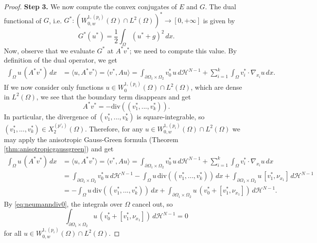 \documentclass[reqno,12pt]{amsart}
\numberwithin{equation}{section}
\begin{document}
\begin{proof}
{\flushleft \bf Step 3.} We now compute the convex conjugates of $E$ and $G$. The dual functional of $G$, i.e. $G^* : (W_{0,w}^{1,(p_i)}(\Omega) \cap L^2(\Omega))^* \rightarrow [0,+\infty ]$ is given by
$$G^*(u^*) = \displaystyle\frac12 \int_\Omega (u^*  + g)^2 \, dx.$$
Now, observe that we evaluate $G^*$ at $A^* v^*$; we need to compute this value. By definition of the dual operator, we get
\begin{align}
\int_\Omega u \, (A^* v^*) \, dx &= \langle u, A^* v^* \rangle  = \langle v^*, Au \rangle = \int_{\partial\Omega_1 \times \Omega_2} v^*_0 \, u \, d\mathcal{H}^{N-1} + \sum_{i=1}^k \int_\Omega v_i^* \cdot \nabla_{x_i} u \, dx.
\end{align}
If we now consider only functions $u \in W_0^{1,(p_i)}(\Omega) \cap L^2(\Omega)$, which are dense in $L^2(\Omega)$, we see that the boundary term disappears and get
\begin{equation}\label{eq:neumanndiv0}
A^* v^* =- \mathrm{div}((v_1^*, ..., v_k^*)).
\end{equation}
In particular, the divergence of $(v_1^*, ..., v_k^*)$ is square-integrable, so $(v_1^*, ..., v_k^*) \in X_2^{(p'_i)}(\Omega)$. Therefore, for any $u \in W_{0,w}^{1,(p_i)}(\Omega) \cap L^2(\Omega)$ we may apply the anisotropic Gauss-Green formula (Theorem \ref{thm:anisotropicgaussgreen}) and get
\begin{align}
\int_\Omega u \, (A^* v^*) \, dx &= \langle u, A^* v^* \rangle  = \langle v^*, Au \rangle = \int_{\partial\Omega_1 \times \Omega_2} v^*_0 \, u \, d\mathcal{H}^{N-1} + \sum_{i=1}^k \int_\Omega v_i^* \cdot \nabla_{x_i} u \, dx \\
& = \int_{\partial\Omega_1 \times \Omega_2} v^*_0 \, u \, d\mathcal{H}^{N-1} - \int_\Omega u \, \mathrm{div}((v_1^*,...,v_k^*)) \, dx + \int_{\partial\Omega_1 \times \Omega_2} u \, [v_1^*, \nu_{x_1}] \, d\mathcal{H}^{N-1} \\
&= - \int_\Omega u \, \mathrm{div}((v_1^*,...,v_k^*)) \, dx + \int_{\partial\Omega_1 \times \Omega_2} u \, (v_0^*  + [v_1^*, \nu_{x_1}]) \, d\mathcal{H}^{N-1}.
\end{align}
By \eqref{eq:neumanndiv0}, the integrals over $\Omega$ cancel out,  so
\begin{equation}\label{eq:pandpoagreepart1}
\int_{\partial\Omega_1 \times \Omega_2} u \, (v_0^* + [v_1^*, \nu_{x_1}]) \, d\mathcal{H}^{N-1} = 0
\end{equation}
for all $u \in W_{0,w}^{1,(p_i)}(\Omega) \cap L^2(\Omega)$. 


\end{proof}
\end{document}
